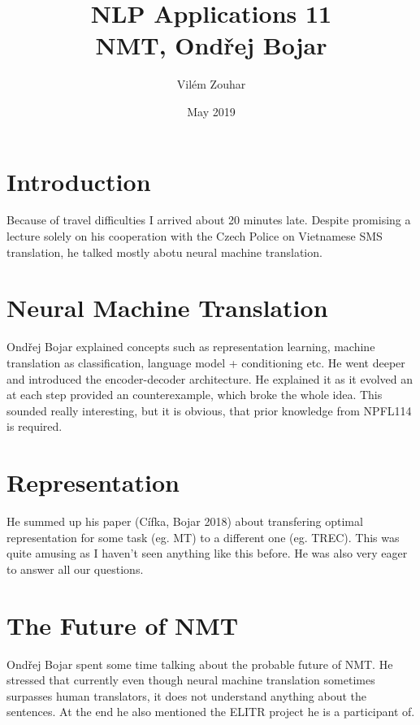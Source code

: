 \documentclass[a4paper]{article}
\begin{document}
\title{NLP Applications 11\\NMT, Ondřej Bojar}
\author{Vilém Zouhar}
\date{May 2019}
\maketitle 

\section*{Introduction}

Because of travel difficulties I arrived about 20 minutes late. Despite promising a lecture solely on his cooperation with the Czech Police on Vietnamese SMS translation, he talked mostly abotu neural machine translation.

\section*{Neural Machine Translation}

Ondřej Bojar explained concepts such as representation learning, machine translation as classification, language model + conditioning etc. He went deeper and introduced the encoder-decoder architecture. He explained it as it evolved an at each step provided an counterexample, which broke the whole idea. This sounded really interesting, but it is obvious, that prior knowledge from NPFL114 is required.

\section*{Representation}

He summed up his paper (Cífka, Bojar 2018) about transfering optimal representation for some task (eg. MT) to a different one (eg. TREC). This was quite amusing as I haven't seen anything like this before. He was also very eager to answer all our questions.

\section*{The Future of NMT}

Ondřej Bojar spent some time talking about the probable future of NMT. He stressed that currently even though neural machine translation sometimes surpasses human translators, it does not understand anything about the sentences. At the end he also mentioned the ELITR project he is a participant of.
\end{document}
